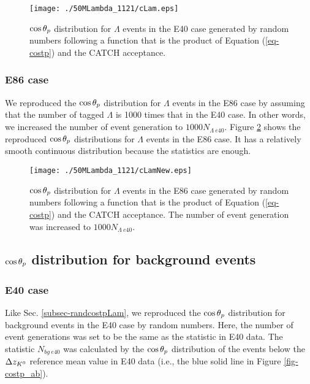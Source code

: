 \begin{figure}[h]
  \centering
  \texttt{[image: ./50MLambda\_1121/cLam.eps]}
  \caption{$\cos{\theta_p}$ distribution for $\Lambda$ events in the E40 case generated by random numbers following a function that is the product of Equation (\ref{eq-costp}) and the CATCH acceptance. %
  }
  \label{fig-cLam}
\end{figure}

\subsubsection{E86 case}
We reproduced the $\cos{\theta_p}$ distribution for $\Lambda$ events in the E86 case by assuming that the number of tagged $\Lambda$ is 1000 times that in the E40 case. In other words, we increased the number of event generation to $1000 N_{\Lambda\ e40}$. Figure \ref{fig-cLamNew} shows the reproduced $\cos{\theta_p}$ distributions for $\Lambda$ events in the E86 case. It has a relatively smooth continuous distribution because the statistics are enough.

\begin{figure}[h]
  \centering
  \texttt{[image: ./50MLambda\_1121/cLamNew.eps]}
  \caption{$\cos{\theta_p}$ distribution for $\Lambda$ events in the E86 case generated by random numbers following a function that is the product of Equation (\ref{eq-costp}) and the CATCH acceptance. The number of event generation was increased to $1000 N_{\Lambda\ e40}$.}
  \label{fig-cLamNew}
\end{figure}


\clearpage
\subsection{$\cos{\theta_p}$ distribution for background events}
\label{subsec-randcostpBG}
\subsubsection{E40 case}
Like Sec. \ref{subsec-randcostpLam}, we reproduced the $\cos{\theta_p}$ distribution for background events in the E40 case by random numbers. Here, the number of event generations was set to be the same as the statistic in E40 data. The statistic $N_{bg\ e40}$ was calculated by the $\cos{\theta_p}$ distribution of the events below the $\Delta z_{K^{0}}$ reference mean value in E40 data (i.e., the blue solid line in Figure \ref{fig-costp_ab}). 

